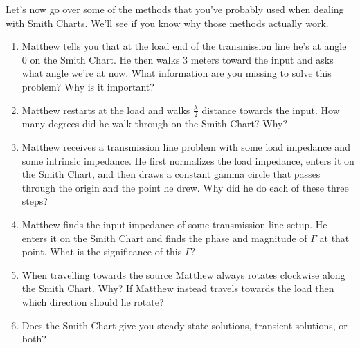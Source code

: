 \documentclass{article}
\begin{document}
Let's now go over some of the methods that you've probably used when dealing with Smith Charts. We'll see if you know why those methods actually work.

\begin{enumerate}
    \item Matthew tells you that at the load end of the transmission line he's at angle 0 on the Smith Chart. He then walks 3 meters toward the input and asks what angle we're at now. What information are you missing to solve this problem? Why is it important?
    \item Matthew restarts at the load and walks $\frac{\lambda}{2}$ distance towards the input. How many degrees did he walk through on the Smith Chart? Why?
    \item Matthew receives a transmission line problem with some load impedance and some intrinsic impedance. He first normalizes the load impedance, enters it on the Smith Chart, and then draws a constant gamma circle that passes through the origin and the point he drew. Why did he do each of these three steps?
    \item Matthew finds the input impedance of some transmission line setup. He enters it on the Smith Chart and finds the phase and magnitude of $\Gamma$ at that point. What is the significance of this $\Gamma$?
    \item When travelling towards the source Matthew always rotates clockwise along the Smith Chart. Why? If Matthew instead travels towards the load then which direction should he rotate?
    \item Does the Smith Chart give you steady state solutions, transient solutions, or both?
\end{enumerate}
\end{document}
